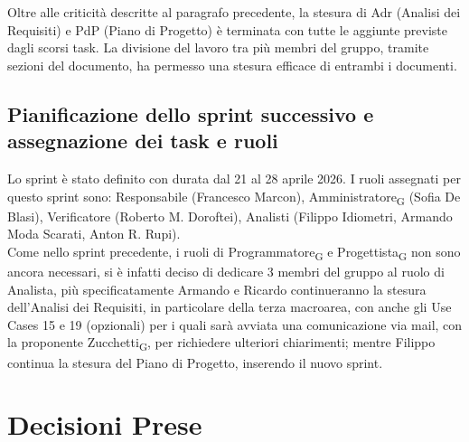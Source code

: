 Oltre alle criticità descritte al paragrafo precedente, la stesura di Adr (Analisi dei Requisiti) e PdP (Piano di Progetto) è terminata con tutte le aggiunte previste dagli scorsi task. La divisione del lavoro tra più membri del gruppo, tramite sezioni del documento, ha permesso una stesura efficace di entrambi i documenti.

\subsection{Pianificazione dello sprint successivo e assegnazione dei task e ruoli}
Lo sprint è stato definito con durata dal 21 al 28 aprile 2026. I ruoli assegnati per questo sprint sono: Responsabile (Francesco Marcon), Amministratore\textsubscript{G} (Sofia De Blasi), Verificatore (Roberto M. Doroftei), Analisti (Filippo Idiometri, Armando Moda Scarati, Anton R. Rupi).\\
Come nello sprint precedente, i ruoli di Programmatore\textsubscript{G} e Progettista\textsubscript{G} non sono ancora necessari, si è infatti deciso di dedicare 3 membri del gruppo al ruolo di Analista, più specificatamente Armando e Ricardo continueranno la stesura dell'Analisi dei Requisiti, in particolare della terza macroarea, con anche gli Use Cases 15 e 19 (opzionali) per i quali sarà avviata una comunicazione via mail, con la proponente Zucchetti\textsubscript{G}, per richiedere ulteriori chiarimenti; mentre Filippo continua la stesura del Piano di Progetto, inserendo il nuovo sprint.
 

\section{Decisioni Prese}

